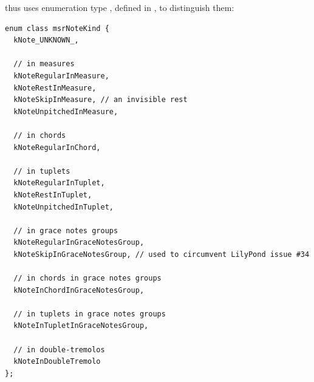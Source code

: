  thus uses enumeration type , defined in , to distinguish them:
\begin{lstlisting}[language=CPlusPlus]
enum class msrNoteKind {
  kNote_UNKNOWN_,

  // in measures
  kNoteRegularInMeasure,
  kNoteRestInMeasure,
  kNoteSkipInMeasure, // an invisible rest
  kNoteUnpitchedInMeasure,

  // in chords
  kNoteRegularInChord,

  // in tuplets
  kNoteRegularInTuplet,
  kNoteRestInTuplet,
  kNoteUnpitchedInTuplet,

  // in grace notes groups
  kNoteRegularInGraceNotesGroup,
  kNoteSkipInGraceNotesGroup, // used to circumvent LilyPond issue #34

  // in chords in grace notes groups
  kNoteInChordInGraceNotesGroup,

  // in tuplets in grace notes groups
  kNoteInTupletInGraceNotesGroup,

  // in double-tremolos
  kNoteInDoubleTremolo
};
\end{lstlisting}


%
%
%
%
%
%
%
%
%
%


